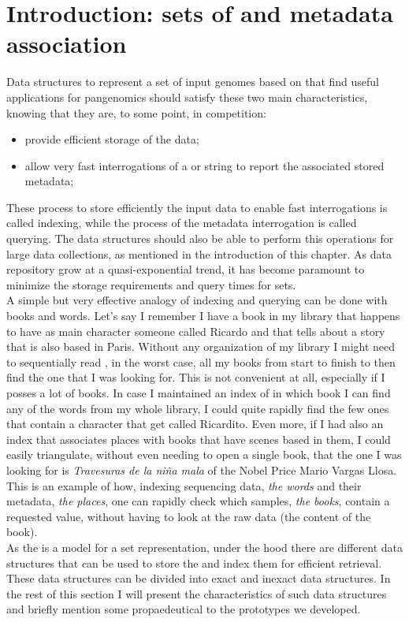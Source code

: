 
\section{Introduction: sets of \kmers and metadata association}
Data structures to represent a set of input genomes based on \kmers that find useful applications for pangenomics should satisfy these two main characteristics, knowing that they are, to some point, in competition:
\begin{itemize}
	\item provide efficient storage of the data;
	\item allow very fast interrogations of a \kmer or string to report the associated stored metadata;
\end{itemize}
These process to store efficiently the input data to enable fast interrogations is called indexing, while the process of the metadata interrogation is called querying. The data structures should also be able to perform this operations for large data collections, as mentioned in the introduction of this chapter. As data repository grow at a quasi-exponential trend, it has become paramount to minimize the storage requirements and query times for \kmer sets. \\
A simple but very effective analogy of indexing and querying can be done with books and words.
Let's say I remember I have a book in my library that happens to have as main character someone called Ricardo and that tells about a story that is also based in Paris. Without any organization of my library I might need to sequentially read , in the worst case, all my books from start to finish to then find the one that I was looking for. This is not convenient at all, especially if I posses a lot of books. In case I maintained an index of in which book I can find any of the words from my whole library, I could quite rapidly find the few ones that contain a character that get called Ricardito. Even more, if I had also an index that associates places with books that have scenes based in them, I could easily triangulate, without even needing to open a single book, that the one I was looking for is \emph{Travesuras de la niña mala} of the Nobel Price  Mario Vargas Llosa.
This is an example of how, indexing sequencing data, \emph{the words} and their metadata, \emph{the places}, one can rapidly check which samples, \emph{the books}, contain a requested value, without having to look at the raw data (the content of the book).\\
As the \dbg is a model for a \kmer set representation, under the hood there are different data structures that can be used to store the \kmers and index them for efficient retrieval. These data structures can be divided into exact and inexact data structures. In the rest of this section I will present the characteristics of such data structures and briefly mention some propaedeutical to the prototypes we developed.

